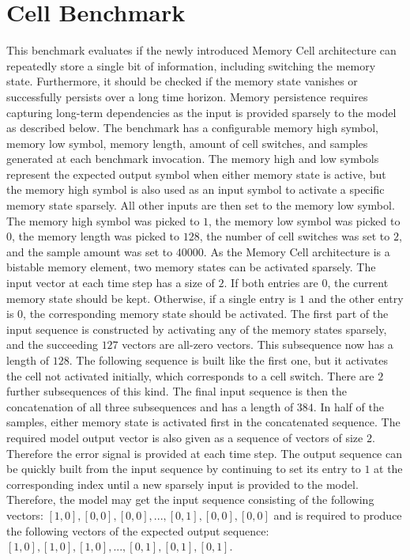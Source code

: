 \documentclass[draft,final]{vutinfth} %
\begin{document}
    \section{Cell Benchmark} \label{cell}
    This benchmark evaluates if the newly introduced Memory Cell architecture can repeatedly store a single bit of information, including switching the memory state.
    Furthermore, it should be checked if the memory state vanishes or successfully persists over a long time horizon.
    Memory persistence requires capturing long-term dependencies as the input is provided sparsely to the model as described below.
    The benchmark has a configurable memory high symbol, memory low symbol, memory length, amount of cell switches, and samples generated at each benchmark invocation.
    The memory high and low symbols represent the expected output symbol when either memory state is active, but the memory high symbol is also used as an input symbol to activate a specific memory state sparsely. All other inputs are then set to the memory low symbol.
    The memory high symbol was picked to $1$, the memory low symbol was picked to $0$, the memory length was picked to $128$, the number of cell switches was set to $2$, and the sample amount was set to $40000$.
    As the Memory Cell architecture is a bistable memory element, two memory states can be activated sparsely.
    The input vector at each time step has a size of $2$. If both entries are $0$, the current memory state should be kept.
    Otherwise, if a single entry is $1$ and the other entry is $0$, the corresponding memory state should be activated.
    The first part of the input sequence is constructed by activating any of the memory states sparsely, and the succeeding $127$ vectors are all-zero vectors.
    This subsequence now has a length of $128$. The following sequence is built like the first one, but it activates the cell not activated initially, which corresponds to a cell switch.
    There are $2$ further subsequences of this kind. The final input sequence is then the concatenation of all three subsequences and has a length of $384$.
    In half of the samples, either memory state is activated first in the concatenated sequence.
    The required model output vector is also given as a sequence of vectors of size $2$. Therefore the error signal is provided at each time step.
    The output sequence can be quickly built from the input sequence by continuing to set its entry to $1$ at the corresponding index until a new sparsely input is provided to the model.
    Therefore, the model may get the input sequence consisting of the following vectors: $[1,0],[0,0],[0,0],...,[0,1],[0,0],[0,0]$ and is required to produce the following vectors of the expected output sequence: $[1,0],[1,0],[1,0],...,[0,1],[0,1],[0,1]$.
\end{document}
